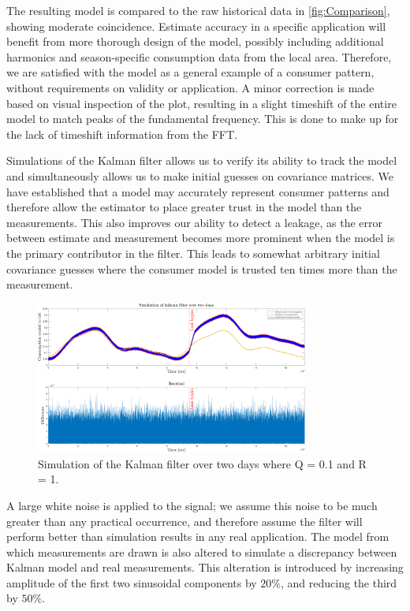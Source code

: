 The resulting model is compared to the raw historical data in \cref{fig:Comparison}, showing moderate coincidence. Estimate accuracy in a specific application will benefit from more thorough design of the model, possibly including additional harmonics and season-specific consumption data from the local area. Therefore, we are satisfied with the model as a general example of a consumer pattern, without requirements on validity or application. A minor correction is made based on visual inspection of the plot, resulting in a slight timeshift of the entire model to match peaks of the fundamental frequency. This is done to make up for the lack of timeshift information from the FFT.

Simulations of the Kalman filter allows us to verify its ability to track the model and simultaneously allows us to make initial guesses on covariance matrices. We have established that a model may accurately represent consumer patterns and therefore allow the estimator to place greater trust in the model than the measurements. This also improves our ability to detect a leakage, as the error between estimate and measurement becomes more prominent when the model is the primary contributor in the filter. This leads to somewhat arbitrary initial covariance guesses where the consumer model is trusted ten times more than the measurement.



\begin{figure}[h!]
	\centering
	\includegraphics[width=0.8\textwidth]{Pictures/Kalman_and_Residual_Q01_R1.pdf}
	
	\caption{Simulation of the Kalman filter over two days where Q = 0.1 and R = 1.}
	\label{fig:Kalman_residual_Q01R1}
\end{figure}


A large white noise is applied to the signal; we assume this noise to be much greater than any practical occurrence, and therefore assume the filter will perform better than simulation results in any real application. The model from which measurements are drawn is also altered to simulate a discrepancy between Kalman model and real measurements. This alteration is introduced by increasing amplitude of the first two sinusoidal components by $20\%$, and reducing the third by $50\%$.

